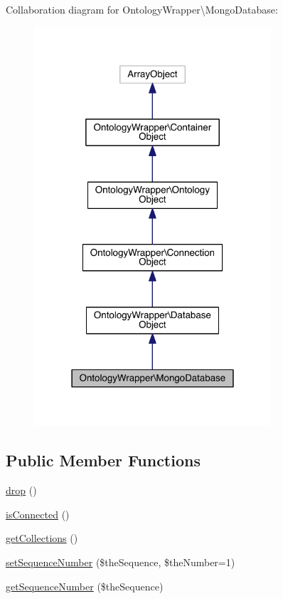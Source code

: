 Collaboration diagram for Ontology\-Wrapper\textbackslash{}Mongo\-Database\-:\nopagebreak
\begin{figure}[H]
\begin{center}
\leavevmode
\includegraphics[width=250pt]{class_ontology_wrapper_1_1_mongo_database__coll__graph}
\end{center}
\end{figure}
\subsection*{Public Member Functions}
\begin{DoxyCompactItemize}
\item 
\hyperlink{class_ontology_wrapper_1_1_mongo_database_ab3df5cac7ce7f15f3c3a2c0feb9cb0ae}{drop} ()
\item 
\hyperlink{class_ontology_wrapper_1_1_mongo_database_aa0d740a0f02a9093b84367d608e0b781}{is\-Connected} ()
\item 
\hyperlink{class_ontology_wrapper_1_1_mongo_database_aea2876ae9fc23f227d34fadfcd91c52b}{get\-Collections} ()
\item 
\hyperlink{class_ontology_wrapper_1_1_mongo_database_abb8850dbf55ad8684ec5244f60d220ba}{set\-Sequence\-Number} (\$the\-Sequence, \$the\-Number=1)
\item 
\hyperlink{class_ontology_wrapper_1_1_mongo_database_a86848d0cc3c72a0a40938338483799a7}{get\-Sequence\-Number} (\$the\-Sequence)
\end{DoxyCompactItemize}
